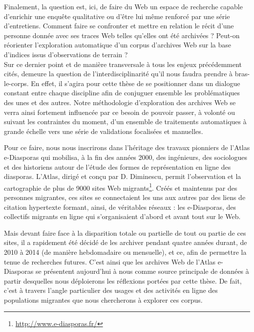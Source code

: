 \documentclass[symmetric,justified,marginals=raggedouter]{tufte-book}
\begin{document}
Finalement, la question est, ici, de faire du Web un espace de recherche capable d'enrichir une enquête qualitative ou d'être lui même renforcé par une série d'entretiens. Comment faire se confronter et mettre en relation le récit d'une personne donnée avec ses traces Web telles qu'elles ont été archivées ? Peut-on réorienter l'exploration automatique d'un corpus d'archives Web sur la base d'indices issus d'observations de terrain ?\\

\noindent Sur ce dernier point et de manière transversale à tous les enjeux précédemment cités, demeure la question de l'interdisciplinarité qu'il nous faudra prendre à bras-le-corps. En effet, il s'agira pour cette thèse de se positionner dans un dialogue constant entre chaque discipline afin de conjuguer ensemble les problématiques des unes et des autres. Notre méthodologie d'exploration des archives Web se verra ainsi fortement influencée par ce besoin de pouvoir passer, à volonté ou suivant les contraintes du moment, d'un ensemble de traitements automatiques à grande échelle vers une série de validations focalisées et manuelles. 

Pour ce faire, nous nous inscrirons dans l'héritage des travaux pionniers de l'Atlas e-Diasporas \citep{diminescu_e-diasporas_2012} qui mobilisa, à la fin des années 2000, des ingénieurs, des sociologues et des historiens autour de l'étude des formes de représentation en ligne des diasporas. L'Atlas, dirigé et conçu par D. Diminescu, permit l'observation et la cartographie de plus de 9000 sites Web migrants\footnote{\RaggedOuter \url{http://www.e-diasporas.fr/}}. Créés et maintenus par des personnes migrantes, ces sites se connectaient les uns aux autres par des liens de citation hypertexte formant, ainsi, de véritables réseaux : les e-Diasporas, des collectifs migrants en ligne qui s'organisaient d'abord et avant tout sur le Web. 

Mais devant faire face à la disparition totale ou partielle de tout ou partie de ces sites, il a rapidement été décidé de les archiver pendant quatre années durant, de 2010 à 2014 (de manière hebdomadaire ou mensuelle), et ce, afin de permettre la tenue de recherches futures. C'est ainsi que les archives Web de l'Atlas e-Diasporas se présentent aujourd'hui à nous comme source principale de données à partir desquelles nous déploierons les réflexions portées par cette thèse. De fait, c'est à travers l'angle particulier des usages et des activités en ligne des populations migrantes que nous chercherons à explorer ces corpus. \\
\end{document}
